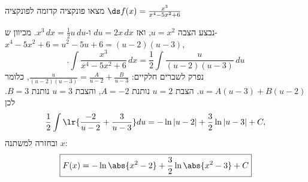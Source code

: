 מצאו פונקציה קדומה לפונקציה
$\ds f(x)=\frac{x^3}{x^4-5x^2+6}$
\begin{solbox}
\unverified
נבצע הצבה
$u=x^2$,
ואז
$du=2x\,dx$
ו-$x^3\,dx=\frac12u\,du$.
מכיוון ש-$x^4-5x^2+6=u^2-5u+6=(u-2)(u-3)$,
$$.\int\frac{x^3}{x^4-5x^2+6}\,dx=\frac12\int\frac{u}{(u-2)(u-3)}\,du$$
נפרק לשברים חלקיים:
$\frac{u}{(u-2)(u-3)}=\frac{A}{u-2}+\frac{B}{u-3}$,
כלומר
$u=A(u-3)+B(u-2)$.
הצבת
$u=2$
נותנת
$A=-2$,
והצבת
$u=3$
נותנת
$B=3$.
לכן
\begin{align*}
\frac12\int\lr{\frac{-2}{u-2}+\frac{3}{u-3}}du=-\ln|u-2|+\frac32\ln|u-3|+C,
\end{align*}
ובחזרה למשתנה
$x$:
\begin{align*}
\boxed{F(x)=-\ln\abs{x^2-2}+\frac32\ln\abs{x^2-3}+C}
\end{align*}
\end{solbox}
